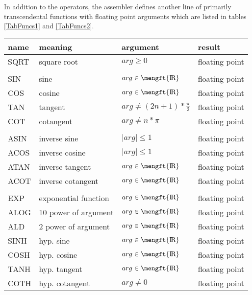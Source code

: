 \documentclass[12pt,twoside]{report}
\def \rz{\hbox{\mengft{I \hskip -1.7mm R}}}
\begin{document}
In addition to the operators, the assembler defines another line of 
primarily transcendental functions with floating point arguments which are
listed in tables \ref{TabFuncs1} and \ref{TabFuncs2}.
\begin{table*}[htbp]
\begin{center}\begin{tabular}{|l|l|l|l|}
\hline
name     & meaning              & argument             & result \\
\hline
\hline
SQRT     & square root          & $arg \geq 0$         & floating point \\
         &                      &                      & \\
SIN      & sine                 & $arg \in \rz$        & floating point \\
COS      & cosine               & $arg \in \rz$        & floating point \\
TAN      & tangent              & $arg \neq (2n+1)*\frac{\pi}{2}$ & floating point \\
COT      & cotangent            & $arg \neq n*\pi$     & floating point \\
         &                      &                      & \\
ASIN     & inverse sine         & $\mid arg \mid \leq 1$ & floating point \\
ACOS     & inverse cosine       & $\mid arg \mid \leq 1$ & floating point \\
ATAN     & inverse tangent      & $arg \in \rz$        & floating point \\
ACOT     & inverse cotangent    & $arg \in \rz$        & floating point \\
         &                      &                      & \\
EXP      & exponential function & $arg \in \rz$        & floating point \\
ALOG     & 10 power of argument & $arg \in \rz$        & floating point \\
ALD      & 2 power of argument  & $arg \in \rz$        & floating point \\
SINH     & hyp. sine            & $arg \in \rz$        & floating point \\
COSH     & hyp. cosine          & $arg \in \rz$        & floating point \\
TANH     & hyp. tangent         & $arg \in \rz$        & floating point \\
COTH     & hyp. cotangent       & $arg \neq 0$         & floating point \\

\end{tabular}
\end{center}
\end{table*}
\end{document}
